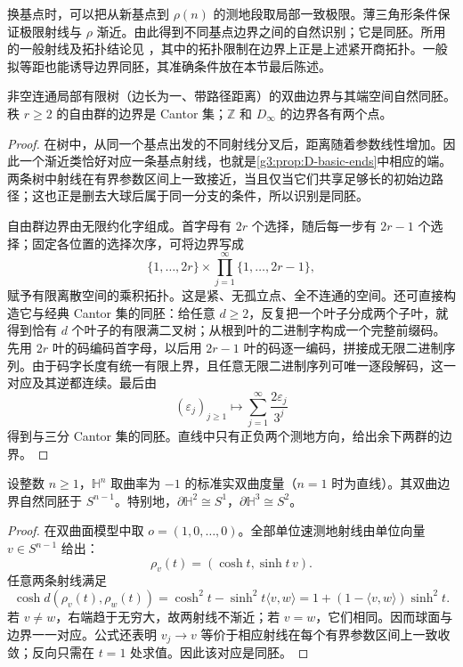 换基点时，可以把从新基点到 \(\rho(n)\) 的测地段取局部一致极限。薄三角形条件保证极限射线与 \(\rho\) 渐近。由此得到不同基点边界之间的自然识别；它是同胚。所用的一般射线及拓扑结论见 \cite[引理III.H.3.1、定义III.H.3.5、引理III.H.3.6、命题III.H.3.7，第427、429--430页]{BridsonHaefliger1999MetricSpaces}，其中的拓扑限制在边界上正是上述紧开商拓扑。一般拟等距也能诱导边界同胚，其准确条件放在本节最后陈述。

\begin{proposition}\label{g3:prop:D-tree-boundary}
	非空连通局部有限树（边长为一、带路径距离）的双曲边界与其端空间自然同胚。秩 \(r\ge2\) 的自由群的边界是 Cantor 集；\(\mathbb Z\) 和 \(D_\infty\) 的边界各有两个点。
\end{proposition}
\begin{proof}
	在树中，从同一个基点出发的不同射线分叉后，距离随着参数线性增加。因此一个渐近类恰好对应一条基点射线，也就是\cref{g3:prop:D-basic-ends}中相应的端。两条树中射线在有界参数区间上一致接近，当且仅当它们共享足够长的初始边路径；这也正是删去大球后属于同一分支的条件，所以识别是同胚。

	自由群边界由无限约化字组成。首字母有 \(2r\) 个选择，随后每一步有 \(2r-1\) 个选择；固定各位置的选择次序，可将边界写成
	\[
		\{1,\ldots,2r\}\times\prod_{j=1}^{\infty}\{1,\ldots,2r-1\},
	\]
	赋予有限离散空间的乘积拓扑。这是紧、无孤立点、全不连通的空间。还可直接构造它与经典 Cantor 集的同胚：给任意 \(d\ge2\)，反复把一个叶子分成两个子叶，就得到恰有 \(d\) 个叶子的有限满二叉树；从根到叶的二进制字构成一个完整前缀码。先用 \(2r\) 叶的码编码首字母，以后用 \(2r-1\) 叶的码逐一编码，拼接成无限二进制序列。由于码字长度有统一有限上界，且任意无限二进制序列可唯一逐段解码，这一对应及其逆都连续。最后由
	\[
		(\varepsilon_j)_{j\ge1}\longmapsto\sum_{j=1}^{\infty}\frac{2\varepsilon_j}{3^j}
	\]
	得到与三分 Cantor 集的同胚。直线中只有正负两个测地方向，给出余下两群的边界。
\end{proof}

\begin{proposition}\label{g3:prop:D-hyperbolic-boundary-sphere}
	设整数 \(n\ge1\)，\(\mathbb H^n\) 取曲率为 \(-1\) 的标准实双曲度量（\(n=1\) 时为直线）。其双曲边界自然同胚于 \(S^{n-1}\)。特别地，\(\partial\mathbb H^2\cong S^1\)，\(\partial\mathbb H^3\cong S^2\)。
\end{proposition}
\begin{proof}
	在双曲面模型中取 \(o=(1,0,\ldots,0)\)。全部单位速测地射线由单位向量 \(v\in S^{n-1}\) 给出：
	\[
		\rho_v(t)=(\cosh t,\sinh t\,v).
	\]
	任意两条射线满足
	\[
		\cosh d(\rho_v(t),\rho_w(t))
		=\cosh^2t-\sinh^2t\langle v,w\rangle
		=1+(1-\langle v,w\rangle)\sinh^2t.
	\]
	若 \(v\ne w\)，右端趋于无穷大，故两射线不渐近；若 \(v=w\)，它们相同。因而球面与边界一一对应。公式还表明 \(v_j\to v\) 等价于相应射线在每个有界参数区间上一致收敛；反向只需在 \(t=1\) 处求值。因此该对应是同胚。
\end{proof}

